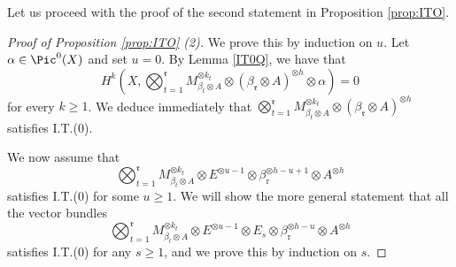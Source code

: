 \documentclass[11pt,letter]{amsart}
\numberwithin{equation}{section}
\begin{document}
   
Let us proceed with the proof of the second statement in Proposition \ref{prop:ITO}. 
   \begin{proof}[Proof of Proposition \ref{prop:ITO} (2)]  
%    
  We prove this by induction on $u$. Let $\alpha\in \Pic^0(X)$ and set $u=0$. 
  By Lemma \ref{IT0Q}, we have that 
\[H^k\left(X,\bigotimes_{t=1}^\mathfrak{r} M_{\beta_t\otimes A}^{\otimes k_t}\otimes (\beta_{\mathfrak{r}}\otimes A)^{\otimes h}\otimes\alpha\right)=0\]
for every $k\geq 1$. We deduce immediately that 
$\bigotimes_{t=1}^\mathfrak{r} M_{\beta_t\otimes A}^{\otimes k_t}\otimes (\beta_{\mathfrak{r}}\otimes A)^{\otimes h}$ satisfies I.T.(0). 

We now assume that 
      \begin{equation}\label{eqn4.5}\bigotimes_{t=1}^{\mathfrak{r}}M_{\beta_t\otimes A}^{\otimes k_t}\otimes E^{\otimes u-1}\otimes \beta_{\mathrm{r}}^{\otimes h-u+1}\otimes A^{\otimes h} \end{equation}
      satisfies I.T.(0) for some $u\geq 1$.    
%
We will show the more general statement that all the vector bundles 
\begin{equation}\label{eqn:2nd}
\bigotimes_{t=1}^{\mathfrak{r}}M_{\beta_t\otimes A}^{\otimes k_t}\otimes E^{\otimes u-1}\otimes E_{s}\otimes \beta_{\mathrm{r}}^{\otimes h-u}\otimes A^{\otimes h}
\end{equation}
 satisfies I.T.(0) for any $ s\geq 1$, and we prove this by induction on $s$. 
 

\end{proof}
\end{document}

